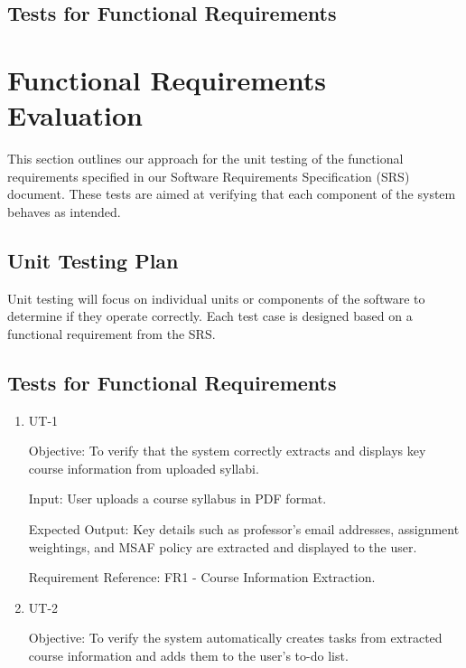 \documentclass[12pt, titlepage]{article}
\begin{document}
\begin{enumerate}
\subsection{Tests for Functional Requirements}

\section{Functional Requirements Evaluation}

This section outlines our approach for the unit testing of the functional requirements specified in our Software Requirements Specification (SRS) document. These tests are aimed at verifying that each component of the system behaves as intended.

\subsection{Unit Testing Plan}

Unit testing will focus on individual units or components of the software to determine if they operate correctly. Each test case is designed based on a functional requirement from the SRS.

\subsection{Tests for Functional Requirements}

\begin{enumerate}
    
    \item{UT-1\\}\label{UT-1}
    
        Objective: To verify that the system correctly extracts and displays key course information from uploaded syllabi.
        
        Input: User uploads a course syllabus in PDF format.
        
        Expected Output: Key details such as professor's email addresses, assignment weightings, and MSAF policy are extracted and displayed to the user.
        
        Requirement Reference: FR1 - Course Information Extraction.
        
    \item{UT-2\\}\label{UT-2}
    
        Objective: To verify the system automatically creates tasks from extracted course information and adds them to the user's to-do list.
        

\end{enumerate}
\end{enumerate}
\end{document}
